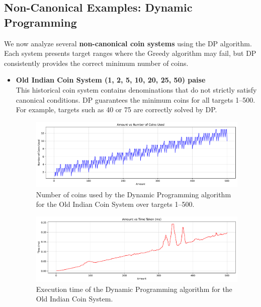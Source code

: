 \documentclass[12pt,a4paper]{report}
\begin{document}
\subsection{Non-Canonical Examples: Dynamic Programming}
We now analyze several \textbf{non-canonical coin systems} using the DP algorithm. Each system presents target ranges where the Greedy algorithm may fail, but DP consistently provides the correct minimum number of coins.

\begin{itemize}
    \item \textbf{Old Indian Coin System (1, 2, 5, 10, 20, 25, 50) paise}\\
    This historical coin system contains denominations that do not strictly satisfy canonical conditions. DP guarantees the minimum coins for all targets 1--500. For example, targets such as 40 or 75 are correctly solved by DP.\\
    \begin{figure}[H]
      \centering
      \includegraphics[width=\textwidth]{graphs/dp_coins_indiancoinsystum_plot.pdf}
      \caption{Number of coins used by the Dynamic Programming algorithm for the Old Indian Coin System over targets 1--500.}
      \label{fig:dp_coins_indiancoinsystum_plot}
    \end{figure}
    \begin{figure}[H]
      \centering
      \includegraphics[width=\textwidth]{graphs/dp_time_indiancoinsystum_plot.pdf}
      \caption{Execution time of the Dynamic Programming algorithm for the Old Indian Coin System.}
      \label{fig:dp_time_indiancoinsystum_plot}
    \end{figure}

\end{itemize}
\end{document}

